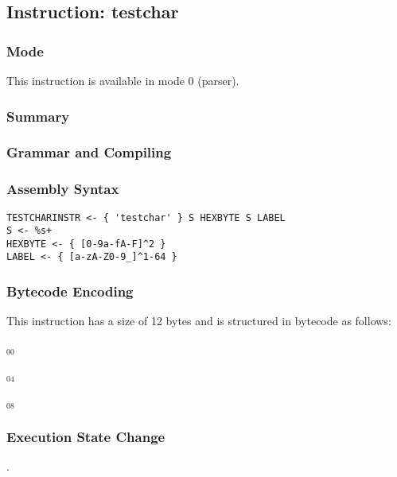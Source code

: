 \subsection{Instruction: testchar}

\subsubsection{Mode}
This instruction is available in mode 0 (parser).
\subsubsection{Summary}


\subsubsection{Grammar and Compiling}


\subsubsection{Assembly Syntax}

\begin{myquote}
\begin{verbatim}
TESTCHARINSTR <- { 'testchar' } S HEXBYTE S LABEL
S <- %s+
HEXBYTE <- { [0-9a-fA-F]^2 }
LABEL <- { [a-zA-Z0-9_]^1-64 }
\end{verbatim}
\end{myquote}

\subsubsection{Bytecode Encoding}

This instruction has a size of 12 bytes and is structured in bytecode as follows:

$_{00}$\ 



$_{04}$\ 



$_{08}$\ 
\fbox{%
  \parbox{20pt}{%
00
  }%
}

\subsubsection{Execution State Change}

.


